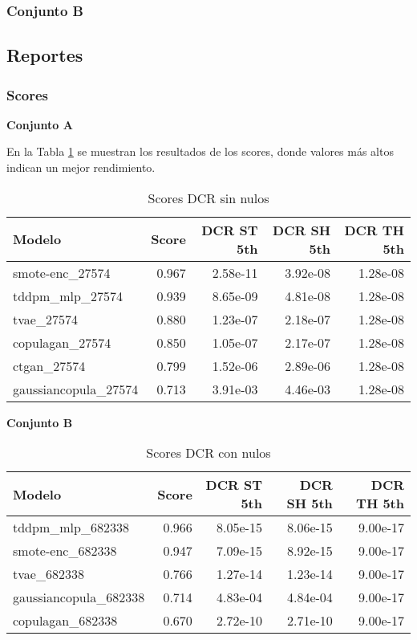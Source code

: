 \subsubsection{Conjunto B}
\label{ds-conjunto-b}


\subsection{Reportes}
\subsubsection{Scores}
\textbf{Conjunto A}


En la Tabla \ref{dcr-eco-a-scores} se muestran los resultados de los scores, donde valores más altos indican un mejor rendimiento.

\begin{table}[H]
    \centering
    \caption{Scores DCR sin nulos}
    \label{dcr-eco-a-scores}
    \begin{tabular}{|l|r|r|r|r|}
        \hline
        \rowcolor[gray]{0.8}
        Modelo & \textbf{Score} & DCR ST 5th & DCR SH 5th & DCR TH 5th \\ \hline
        smote-enc\_27574         & 0.967 & 2.58e-11 & 3.92e-08 & 1.28e-08 \\ \hline
        tddpm\_mlp\_27574        & 0.939 & 8.65e-09 & 4.81e-08 & 1.28e-08 \\ \hline
        tvae\_27574              & 0.880 & 1.23e-07 & 2.18e-07 & 1.28e-08 \\ \hline
        copulagan\_27574         & 0.850 & 1.05e-07 & 2.17e-07 & 1.28e-08 \\ \hline
        ctgan\_27574             & 0.799 & 1.52e-06 & 2.89e-06 & 1.28e-08 \\ \hline
        gaussiancopula\_27574    & 0.713 & 3.91e-03 & 4.46e-03 & 1.28e-08 \\ \hline
    \end{tabular}
\end{table}


\textbf{Conjunto B}
\label{ds-conjunto-b}

\begin{table}[H]
    \centering
    \caption{Scores DCR con nulos}
    \label{dcr-eco-b-scores}
    \begin{tabular}{|l|r|r|r|r|}
        \hline
        \rowcolor[gray]{0.8}
        Modelo & \textbf{Score} & DCR ST 5th & DCR SH 5th & DCR TH 5th \\ \hline
        tddpm\_mlp\_682338          & 0.966 & 8.05e-15 & 8.06e-15 & 9.00e-17 \\ \hline
        smote-enc\_682338           & 0.947 & 7.09e-15 & 8.92e-15 & 9.00e-17 \\ \hline
        tvae\_682338                & 0.766 & 1.27e-14 & 1.23e-14 & 9.00e-17 \\ \hline
        gaussiancopula\_682338      & 0.714 & 4.83e-04 & 4.84e-04 & 9.00e-17 \\ \hline
        copulagan\_682338           & 0.670 & 2.72e-10 & 2.71e-10 & 9.00e-17 \\ \hline
    \end{tabular}
\end{table}

